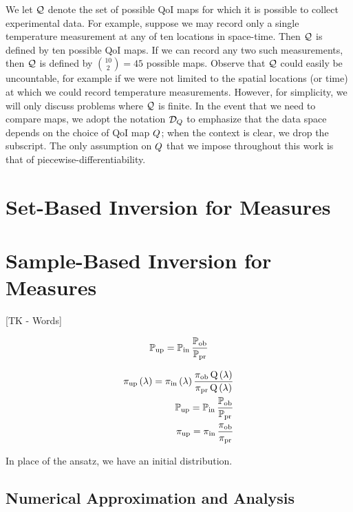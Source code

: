 We let $\mathcal{Q}$ denote the set of possible QoI maps for which it is possible to collect experimental data.
For example, suppose we may record only a single temperature measurement at any of ten locations in space-time.
Then $\mathcal{Q}$ is defined by ten possible QoI maps.
If we can record any two such measurements, then $\mathcal{Q}$ is defined by $\binom{10}{2} = 45$ possible maps.
Observe that $\mathcal{Q}$ could easily be uncountable, for example if we were not limited to the spatial locations (or time) at which we could record temperature measurements.
However, for simplicity, we will only discuss problems where $\mathcal{Q}$ is finite.
In the event that we need to compare maps, we adopt the notation $\mathcal{D}_{Q}$ to emphasize that the data space depends on the choice of QoI map $Q$; when the context is clear, we drop the subscript.
The only assumption on $Q$ that we impose throughout this work is that of piecewise-differentiability.


\pagebreak
\section{Set-Based Inversion for Measures}\label{sec:ch02-set}




\pagebreak
\section{Sample-Based Inversion for Measures}\label{sec:ch02-sample}
[TK - Words]

\begin{equation}
\operatorname*{\mathbb{P}_{up}} = \operatorname*{\mathbb{P}_{in}} \frac{\operatorname*{\mathbb{P}_{ob}}}{\operatorname*{\mathbb{P}_{pr}}}
\end{equation}

\begin{equation}
\begin{split}
\operatorname*{\operatorname*{\pi_{up}}\left ( \lambda \right ) = \operatorname*{\pi_{in}}\left ( \lambda \right ) \frac{\operatorname*{\pi_{ob}}Q\left ( \lambda \right )}{\operatorname*{\pi_{pr}}Q\left ( \lambda \right )}}\\
\operatorname*{\operatorname*{\mathbb{P}_{up}} = \operatorname*{\mathbb{P}_{in}} \frac{\operatorname*{\mathbb{P}_{ob}}}{\operatorname*{\mathbb{P}_{pr}}}}\\
\operatorname*{\operatorname*{\pi_{up}} = \operatorname*{\pi_{in}} \frac{\operatorname*{\pi_{ob}}}{\operatorname*{\pi_{pr}}}}
\end{split}
\end{equation}

In place of the ansatz, we have an initial distribution.

\subsection{Numerical Approximation and Analysis}\label{sec:sample-approx}


